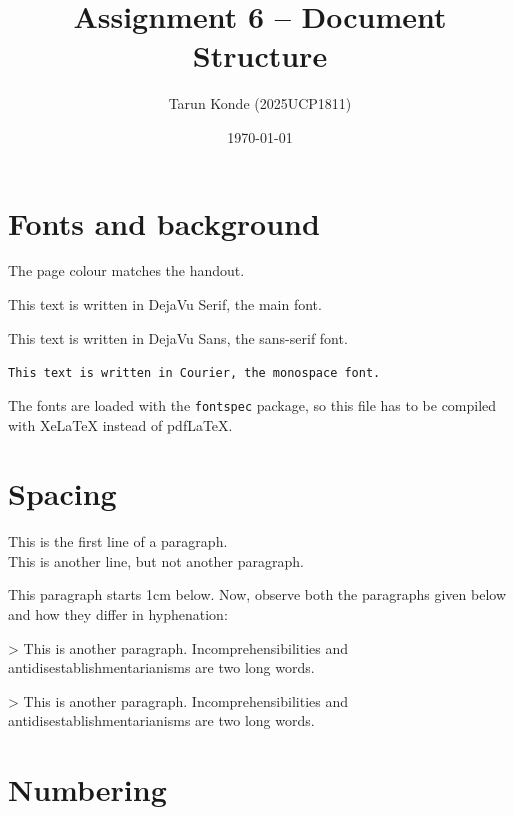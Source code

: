 \documentclass[12pt,a4paper]{article}
\title{Assignment 6 -- Document Structure}
\author{Tarun Konde (2025UCP1811)}
\date{\today}
\begin{document}
\maketitle

\section{Fonts and background}

The page colour matches the handout.

\begin{trivlist}
    \item \textrm{This text is written in DejaVu Serif, the main font.}
    \item \textsf{This text is written in DejaVu Sans, the sans-serif font.}
    \item \texttt{This text is written in Courier, the monospace font.}
\end{trivlist}

The fonts are loaded with the \texttt{fontspec} package, so this file has to be
compiled with Xe\LaTeX{} instead of pdf\LaTeX.

\section{Spacing}

This is the first line of a paragraph.\\
This is another line, but not another paragraph.

\vspace{1cm}
This paragraph starts 1cm below. Now, observe both the paragraphs given below
and how they differ in hyphenation:

> This is another paragraph. Incomprehensibilities and
antidisestablishmentarianisms are two long words.

{ 
> This is another paragraph. Incomprehensibilities and antidisestablishmentarianisms
are two long words.\par}

\newpage
{}

\section{Numbering}
\end{document}
